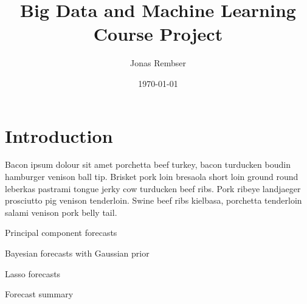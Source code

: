 \documentclass[a4paper,11pt]{scrartcl}
\title{Big Data and Machine Learning \\ Course Project}
\author{Jonas Rembser}
\date{\today}
\begin{document}
\maketitle

%
\section{Introduction}

Bacon ipsum dolour sit amet porchetta beef turkey, bacon turducken boudin hamburger venison ball tip. Brisket pork loin bresaola short loin ground round leberkas pastrami tongue jerky cow turducken beef ribs. Pork ribeye landjaeger prosciutto pig venison tenderloin. Swine beef ribs kielbasa, porchetta tenderloin salami venison pork belly tail.

\begin{table}[ht]
    \caption{Principal component forecasts}
    \centering
    
    \begin{center}
    
    \end{center}
    \label{table:pc}
\end{table}

\begin{table}[ht]
    \caption{Bayesian forecasts with Gaussian prior}
    \centering
    
    \begin{center}
    
    \end{center}
    \label{table:ridge}
\end{table}

\begin{table}[ht]
    \caption{Lasso forecasts}
    \centering
    
    \begin{center}
    
    \end{center}
    \label{table:lasso}
\end{table}

\begin{table}[ht]
    \caption{Forecast summary}
    \centering
    
    \begin{center}
    
    \end{center}
    \label{table:all}
\end{table}
\end{document}

